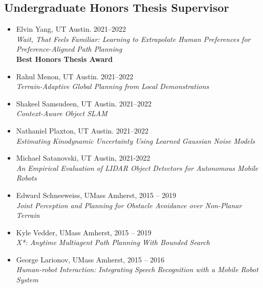\documentclass[Times]{article}
\begin{document}
\subsection*{Undergraduate Honors Thesis Supervisor}
\begin{itemize}
 \item Elvin Yang, UT Austin. 2021--2022\\
 \emph{Wait, That Feels Familiar: Learning to Extrapolate Human Preferences for Preference-Aligned Path Planning}\\
 \textbf{Best Honors Thesis Award}
 \item Rahul Menon, UT Austin. 2021--2022\\
 \emph{Terrain-Adaptive Global Planning from Local Demonstrations}
 \item Shakeel Samsudeen, UT Austin. 2021--2022\\
 \emph{Context-Aware Object SLAM}
 \item Nathaniel Plaxton, UT Austin. 2021--2022\\
 \emph{Estimating Kinodynamic Uncertainty Using Learned Gaussian Noise Models}
 \item Michael Satanovski, UT Austin, 2021-2022\\
 \emph{An Empirical Evaluation of LIDAR Object Detectors for Autonomous Mobile Robots}
 \item Edward Schneeweiss, UMass Amherst, 2015 -- 2019\\
  \emph{Joint Perception and Planning for Obstacle Avoidance over Non-Planar Terrain}
 \item Kyle Vedder, UMass Amherst, 2015 -- 2019\\
  \emph{X*: Anytime Multiagent Path Planning With Bounded Search}
 \item George Larionov, UMass Amherst, 2015 -- 2016\\
  \emph{Human-robot Interaction: Integrating Speech Recognition with a Mobile Robot System}
\end{itemize}
\end{document}
